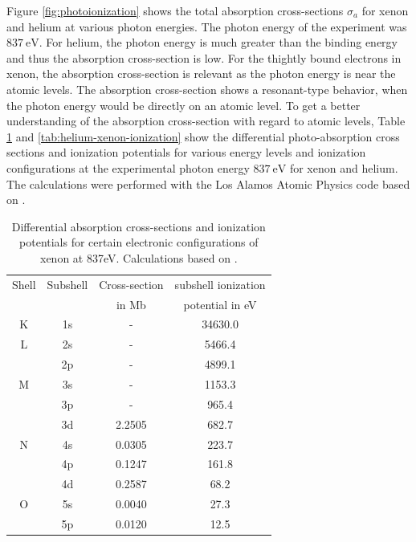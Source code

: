 Figure \ref{fig:photoionization} shows the total absorption cross-sections $\sigma_{a}$ for xenon and helium at various photon energies. The photon energy of the experiment was $\SI{837}{\electronvolt}$. For helium, the photon energy is much greater than the binding energy and thus the absorption cross-section is low. For the thightly bound electrons in xenon, the absorption cross-section is relevant as the photon energy is near the atomic levels. The absorption cross-section shows a resonant-type behavior, when the photon energy would be directly on an atomic level. To get a better understanding of the absorption cross-section with regard to atomic levels, Table \ref{tab:xenon-photoionization-cross-section} and \ref{tab:helium-xenon-ionization} show the differential photo-absorption cross sections and ionization potentials for various energy levels and ionization configurations at the experimental photon energy $\SI{837}{\electronvolt}$ for xenon and helium. The calculations were performed with the Los Alamos Atomic Physics code based on \citep{Cowan-1981-Cal}.
\begin{table}
	\centering
		\begin{tabular}{ | c | c | c | c | }
			\hline
			Shell & Subshell & Cross-section & subshell ionization \\
				&	& in Mb & potential in eV \\ \hline
			K & 1s & - & 34630.0 \\ \hline
			L & 2s & - & 5466.4  \\ 
			\ & 2p & - & 4899.1 \\ \hline
			M & 3s & - & 1153.3  \\ 
			\ & 3p & - & 965.4 \\ 
			\ & 3d & 2.2505 & 682.7 \\ \hline
			N & 4s & 0.0305 & 223.7 \\ 
			\ & 4p & 0.1247 & 161.8 \\ 
			\ & 4d & 0.2587 & 68.2  \\ \hline
			O & 5s & 0.0040 & 27.3  \\ 
			\ & 5p & 0.0120 & 12.5  \\ \hline
		\end{tabular}
	\caption[Differential absorption cross-sections and ionization potentials for xenon.]{Differential absorption cross-sections and ionization potentials for certain electronic configurations of xenon at 837eV. Calculations based on \citep{Cowan-1981-Cal}.}
	\label{tab:xenon-photoionization-cross-section}
\end{table}
